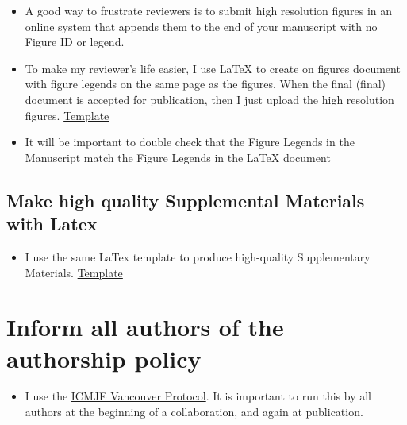 \documentclass[
  letterpaper,
  DIV=11,
  numbers=noendperiod]{scrreprt}
\providecommand{\tightlist}{%
  \setlength{\itemsep}{0pt}\setlength{\parskip}{0pt}}\usepackage{longtable,booktabs,array}
\begin{document}
\begin{itemize}
\item
  A good way to frustrate reviewers is to submit high resolution figures
  in an online system that appends them to the end of your manuscript
  with no Figure ID or legend.
\item
  To make my reviewer's life easier, I use LaTeX to create on figures
  document with figure legends on the same page as the figures. When the
  final (final) document is accepted for publication, then I just upload
  the high resolution figures.
  \href{https://drive.google.com/drive/folders/1mbvkizpPnM4CjkTTj2ARENtEqDwhXYDU?usp=sharing}{Template}
\item
  It will be important to double check that the Figure Legends in the
  Manuscript match the Figure Legends in the LaTeX document
\end{itemize}

\hypertarget{make-high-quality-supplemental-materials-with-latex}{%
\subsection*{\texorpdfstring{\textbf{Make high quality Supplemental
Materials with
Latex}}{Make high quality Supplemental Materials with Latex}}\label{make-high-quality-supplemental-materials-with-latex}}

\begin{itemize}
\tightlist
\item
  I use the same LaTex template to produce high-quality Supplementary
  Materials.
  \href{https://drive.google.com/drive/folders/1mbvkizpPnM4CjkTTj2ARENtEqDwhXYDU?usp=sharing}{Template}
\end{itemize}

\hypertarget{inform-all-authors-of-the-authorship-policy}{%
\section*{\texorpdfstring{\textbf{Inform all authors of the authorship
policy}}{Inform all authors of the authorship policy}}\label{inform-all-authors-of-the-authorship-policy}}

\begin{itemize}
\tightlist
\item
  I use the
  \href{http://www.icmje.org/recommendations/browse/roles-and-responsibilities/defining-the-role-of-authors-and-contributors.html}{ICMJE
  Vancouver Protocol}. It is important to run this by all authors at the
  beginning of a collaboration, and again at publication.
\end{itemize}
\end{document}
